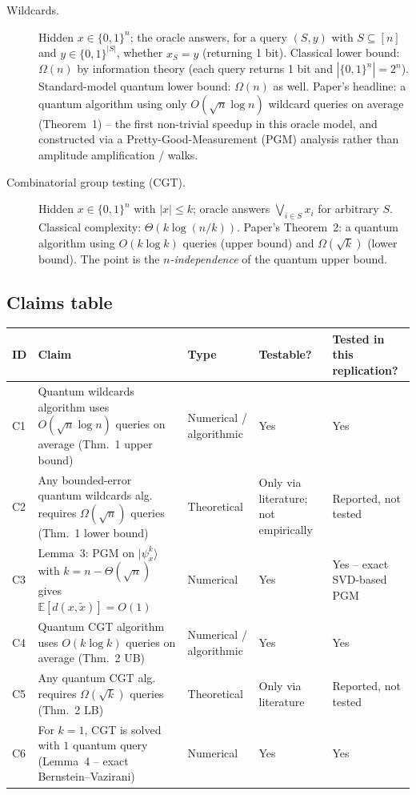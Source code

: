 \documentclass[11pt]{article}
\begin{document}
\begin{description}
  \item[Wildcards.] Hidden $x\in\{0,1\}^n$; the oracle answers, for a query
  $(S,y)$ with $S\subseteq[n]$ and $y\in\{0,1\}^{|S|}$, whether $x_S=y$
  (returning 1 bit). Classical lower bound: $\Omega(n)$ by information theory
  (each query returns 1 bit and $|\{0,1\}^n|=2^n$). Standard-model quantum
  lower bound: $\Omega(n)$ as well. Paper's headline: a quantum algorithm
  using only $O(\sqrt n\log n)$ wildcard queries on average (Theorem~1) --
  the first non-trivial speedup in this oracle model, and constructed via a
  Pretty-Good-Measurement (PGM) analysis rather than amplitude
  amplification / walks.
  \item[Combinatorial group testing (CGT).] Hidden $x\in\{0,1\}^n$ with
  $|x|\le k$; oracle answers $\bigvee_{i\in S} x_i$ for arbitrary $S$.
  Classical complexity: $\Theta(k\log(n/k))$. Paper's Theorem~2: a quantum
  algorithm using $O(k\log k)$ queries (upper bound) and $\Omega(\sqrt k)$
  (lower bound). The point is the \emph{$n$-independence} of the quantum
  upper bound.
\end{description}

\subsection{Claims table}

\begin{center}
\begin{tabular}{@{}lp{5.6cm}lll@{}}
\toprule
ID & Claim & Type & Testable? & Tested in this replication? \\
\midrule
C1 & Quantum wildcards algorithm uses $O(\sqrt n \log n)$ queries on
     average (Thm.~1 upper bound) & Numerical / algorithmic & Yes & Yes \\
C2 & Any bounded-error quantum wildcards alg. requires
     $\Omega(\sqrt n)$ queries (Thm.~1 lower bound) & Theoretical & Only via
     literature; not empirically & Reported, not tested \\
C3 & Lemma~3: PGM on $|\psi_x^k\rangle$ with $k=n-\Theta(\sqrt n)$ gives
     $\mathbb{E}[d(x,\tilde x)]=O(1)$ & Numerical & Yes & Yes -- exact SVD-based PGM \\
C4 & Quantum CGT algorithm uses $O(k\log k)$ queries on average (Thm.~2 UB) &
     Numerical / algorithmic & Yes & Yes \\
C5 & Any quantum CGT alg. requires $\Omega(\sqrt k)$ queries (Thm.~2 LB) &
     Theoretical & Only via literature & Reported, not tested \\
C6 & For $k=1$, CGT is solved with $1$ quantum query (Lemma~4 -- exact
     Bernstein--Vazirani) & Numerical & Yes & Yes \\
\bottomrule
\end{tabular}
\end{center}
\end{document}
